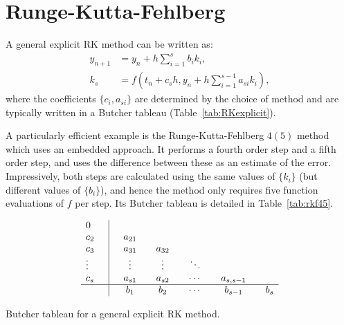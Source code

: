 \section{Runge-Kutta-Fehlberg}
\label{sec:rkf}

A general explicit RK method can be written as:
\begin{align}
  y_{n+1} &= y_n + h\sum\limits_{i=1}^{s} b_i k_i, \label{eqn:rk_step} \\
  k_s &= f(t_n + c_s h, y_n + h \sum\limits_{i=1}^{s-1}a_{si} k_i),
\end{align}
where the coefficients $\{c_i,a_{si}\}$ are determined by the choice of method and are typically written in a Butcher tableau (Table~\ref{tab:RKexplicit}). 

A particularly efficient example is the Runge-Kutta-Fehlberg $4(5)$ method which uses an embedded approach. It performs a fourth order step and a fifth order step, and uses the difference between these as an estimate of the error. Impressively, both steps are calculated using the same values of $\{k_i\}$ (but different values of $\{b_i\}$), and hence the method only requires five function evaluations of $f$ per step. Its Butcher tableau is detailed in Table~\ref{tab:rkf45}.

\begin{table}[h]
  \begin{equation*}
    \begin{array}{l | c c c c c}
      0      \quad &               &              &              &         &   \\
      c_2    \quad & \quad a_{21}  &              &              &         &   \\
      c_3    \quad & \quad a_{31}  & \quad a_{32} &              &         &   \\
      \vdots \quad & \quad \vdots  & \quad \vdots & \quad \ddots &         &   \\
      c_s    \quad & \quad a_{s1}  & \quad a_{s2} & \quad \cdots & \quad a_{s,s-1} & \\ \hline
      & \quad b_{1}   & \quad b_{2}  & \quad \cdots & \quad b_{s-1}  & \quad b_{s}
    \end{array}
  \end{equation*}
  \caption{Butcher tableau for a general explicit RK method.}
  \label{tab:RKexplicit}
\end{table}

